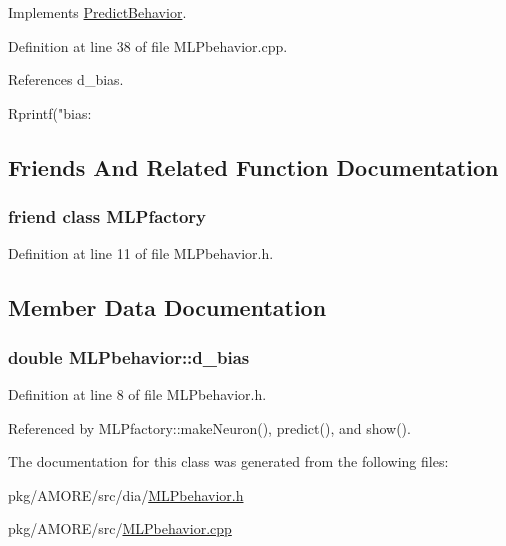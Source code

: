 Implements \hyperlink{class_predict_behavior_a9ef84360f73784248d994fa4707c1dde}{PredictBehavior}.



Definition at line 38 of file MLPbehavior.cpp.



References d\_\-bias.


\begin{DoxyCode}
{
  Rprintf("\n bias: %
}
\end{DoxyCode}


\subsection{Friends And Related Function Documentation}
\hypertarget{class_m_l_pbehavior_a1aa48940238b9487734e590ffab33a1b}{
\subsubsection[{MLPfactory}]{\setlength{\rightskip}{0pt plus 5cm}friend class {\bf MLPfactory}}}
\label{class_m_l_pbehavior_a1aa48940238b9487734e590ffab33a1b}


Definition at line 11 of file MLPbehavior.h.



\subsection{Member Data Documentation}
\hypertarget{class_m_l_pbehavior_a6206785c5c3f838a0538f9f77fa7a25a}{
\subsubsection[{d\_\-bias}]{\setlength{\rightskip}{0pt plus 5cm}double {\bf MLPbehavior::d\_\-bias}}}
\label{class_m_l_pbehavior_a6206785c5c3f838a0538f9f77fa7a25a}


Definition at line 8 of file MLPbehavior.h.



Referenced by MLPfactory::makeNeuron(), predict(), and show().



The documentation for this class was generated from the following files:\begin{DoxyCompactItemize}
\item 
pkg/AMORE/src/dia/\hyperlink{_m_l_pbehavior_8h}{MLPbehavior.h}\item 
pkg/AMORE/src/\hyperlink{_m_l_pbehavior_8cpp}{MLPbehavior.cpp}\end{DoxyCompactItemize}
